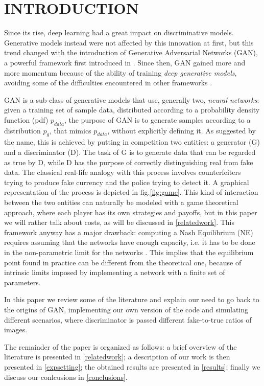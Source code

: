 \section{INTRODUCTION} \label{intro}

Since its rise, deep learning had a great impact on discriminative models. Generative models instead were not affected by this innovation at first, but this trend changed with the introduction of Generative Adversarial Networks (GAN), a powerful framework first introduced in \cite{NIPS2014_5423}. Since then, GAN gained more and more momentum because of the ability of training \textit{deep generative models}, avoiding some of the difficulties encountered in other frameworks \cite{DBLP:journals/corr/Goodfellow17}.

GAN is a sub-class of generative models that use, generally two, \textit{neural networks}: given a training set of sample data, distributed according to a probability density function (pdf) $p_{data}$, the purpose of GAN is to generate samples according to a distribution $p_g$, that mimics $p_{data}$, without explicitly defining it.
As suggested by the name, this is achieved by putting in competition two entities: a generator (G) and a discriminator (D). The task of G is to generate data that can be regarded as true by D, while D has the purpose of correctly distinguishing real from fake data. The classical real-life analogy with this process involves counterfeiters trying to produce fake currency and the police trying to detect it. A graphical representation of the process is depicted in fig.\ref{fig:game}.
This kind of interaction between the two entities can naturally be modeled with a game theoretical approach, where each player has its own strategies and payoffs, but in this paper we will rather talk about costs, as will be discussed in \ref{relatedwork}.
This framework anyway has a major drawback: computing a Nash Equilibrium (NE) requires assuming that the networks have enough capacity, i.e. it has to be done in the non-parametric limit for the networks \cite{NIPS2014_5423}. This implies that the equilibrium point found in practice can be different from the theoretical one, because of intrinsic limits imposed by implementing a network with a finite set of parameters.

In this paper we review some of the literature and explain our need to go back to the origins of GAN, implementing our own version of the code and simulating different scenarios, where discriminator is passed different fake-to-true ratios of images.

The remainder of the paper is organized as follows: a brief overview of the literature is presented in \ref{relatedwork}; a description of our work is then presented in \ref{expsetting}; the obtained results are presented in \ref{results}; finally we discuss our conlcusions in \ref{conclusions}.